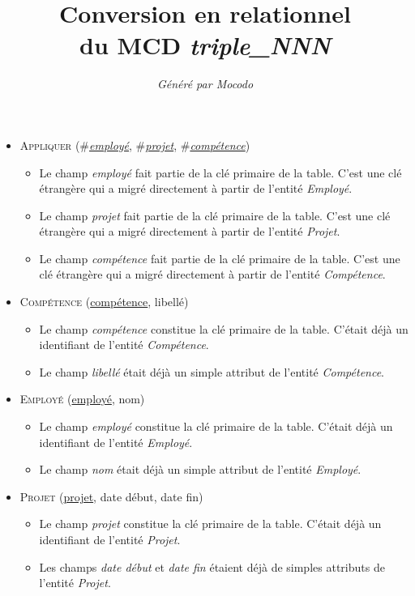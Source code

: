 \documentclass[a4paper]{article}
\title{Conversion en relationnel\\du MCD \emph{triple_NNN}}
\author{\emph{Généré par Mocodo}}
\newcommand{\relat}[1]{\textsc{#1}}
\newcommand{\attr}[1]{#1}
\newcommand{\prim}[1]{\uline{#1}}
\newcommand{\foreign}[1]{\#\textsl{#1}}
\begin{document}
\maketitle

\begin{itemize}
  \item \relat{Appliquer} (\foreign{\prim{employé}}, \foreign{\prim{projet}}, \foreign{\prim{compétence}})
  \begin{itemize}
    \item Le champ \emph{employé} fait partie de la clé primaire de la table. C'est une clé étrangère qui a migré directement à partir de l'entité \emph{Employé}.
    \item Le champ \emph{projet} fait partie de la clé primaire de la table. C'est une clé étrangère qui a migré directement à partir de l'entité \emph{Projet}.
    \item Le champ \emph{compétence} fait partie de la clé primaire de la table. C'est une clé étrangère qui a migré directement à partir de l'entité \emph{Compétence}.
  \end{itemize}

  \item \relat{Compétence} (\prim{compétence}, \attr{libellé})
  \begin{itemize}
    \item Le champ \emph{compétence} constitue la clé primaire de la table. C'était déjà un identifiant de l'entité \emph{Compétence}.
    \item Le champ \emph{libellé} était déjà un simple attribut de l'entité \emph{Compétence}.
  \end{itemize}

  \item \relat{Employé} (\prim{employé}, \attr{nom})
  \begin{itemize}
    \item Le champ \emph{employé} constitue la clé primaire de la table. C'était déjà un identifiant de l'entité \emph{Employé}.
    \item Le champ \emph{nom} était déjà un simple attribut de l'entité \emph{Employé}.
  \end{itemize}

  \item \relat{Projet} (\prim{projet}, \attr{date début}, \attr{date fin})
  \begin{itemize}
    \item Le champ \emph{projet} constitue la clé primaire de la table. C'était déjà un identifiant de l'entité \emph{Projet}.
    \item Les champs \emph{date début} et \emph{date fin} étaient déjà de simples attributs de l'entité \emph{Projet}.
  \end{itemize}

\end{itemize}
\end{document}
